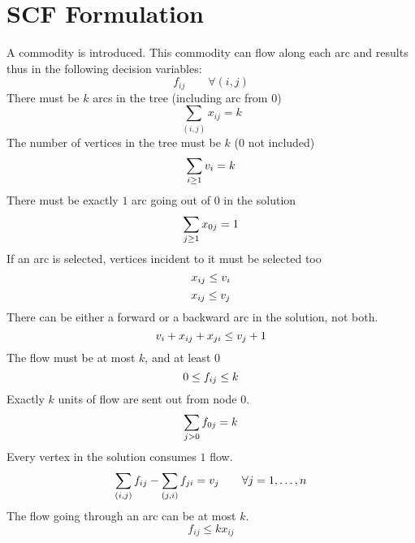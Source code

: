 \documentclass[a4paper]{article}
\numberwithin{equation}{section}
\begin{document}
\section{SCF Formulation}
A commodity is introduced. This commodity can flow along each 
arc and results thus in the following decision variables:
\begin{equation}
  f_{ij} \qquad \forall (i,j)
\end{equation}
There must be $k$ arcs in the tree (including arc from $0$)
\begin{equation}
	\sum_{(i,j)} x_{ij} = k
\end{equation}
The number of vertices in the tree must be $k$ ($0$ not included)
\begin{equation}
	\sum_{i \geq 1}v_i =k \\
\end{equation}
There must be exactly $1$ arc going out of $0$ in the solution
\begin{equation}
	\sum_{j \geq 1} x_{0j}=1\\
\end{equation}
If an arc is selected, vertices incident to it must be selected too
\begin{equation}
	x_{ij} \leq v_i\\
\end{equation}
\begin{equation}
	x_{ij} \leq v_j\\
\end{equation}
There can be either a forward or a backward arc in the solution, not both.
\begin{equation}
	v_i + x_{ij} + x_{ji} \leq v_j + 1\\
\end{equation}
The flow must be at most $k$, and at least $0$
\begin{equation}
	0 \leq f_{ij} \leq k\\
\end{equation}
Exactly $k$ units of flow are sent out from node $0$.
\begin{equation}
	\sum_{j>0} f_{0j}=k \\
\end{equation}
Every vertex in the solution consumes $1$ flow.
\begin{equation}
  \sum_{(i,j)} f_{ij} - \sum_{(j,i)} f_{ji} = v_j \qquad \forall j=1,\dots,n\\
\end{equation}
The flow going through an arc can be at most $k$.
\begin{equation}
	f_{ij}\leq kx_{ij}
\end{equation}
\end{document}
